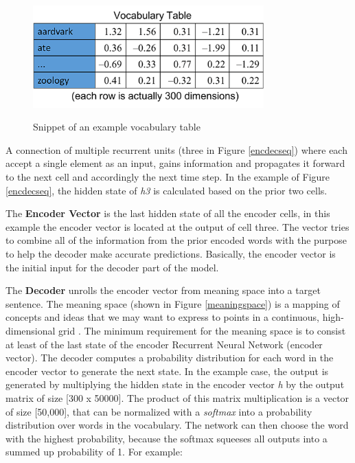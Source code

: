 \begin{figure}
	\begin{center}
		\includegraphics[width=3.5in]{photos/w1-16}\\
		\caption{Snippet of an example vocabulary table \cite{mugan}}\label{voctable}
	\end{center}
\end{figure}

A connection of multiple recurrent units (three in Figure \ref{encdecseq}) where each accept a single element as an input, gains information and propagates it forward to the next cell and accordingly the next time step. In the example of Figure \ref{encdecseq}, the hidden state of \textit{h3} is calculated based on the prior two cells.


The \textbf{Encoder Vector} is the last hidden state of all the encoder cells, in this example the encoder vector is located at the output of cell three. The vector tries to combine all of the information from the prior encoded words with the purpose to help the decoder make accurate predictions. Basically, the encoder vector is the initial input for the decoder part of the model.

The \textbf{Decoder} unrolls the encoder vector from meaning space into a target sentence. The meaning space (shown in Figure \ref{meaningspace}) is a mapping of concepts and ideas that we may want to express to points in a continuous, high-dimensional grid \cite{mugan}. 
The minimum requirement for the meaning space is to consist at least of the last state of the encoder Recurrent Neural Network (encoder vector). The decoder computes a probability distribution for each word in the encoder vector to generate the next state. In the example case, the output is generated by multiplying the hidden state in the encoder vector \textit{h} by the output matrix of size [300 x 50000]. The product of this matrix multiplication is a vector of size [50,000], that can be normalized with a \textit{softmax} into a probability distribution over words in the vocabulary. The network can then choose the word with the highest probability, because the softmax squeeses all outputs into a summed up probability of 1. For example:

